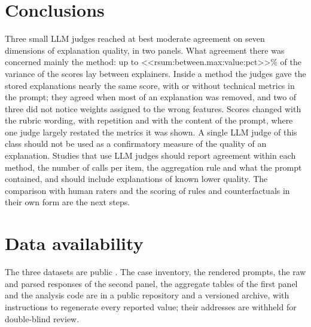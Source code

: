 \documentclass[12pt,letterpaper]{article}
\newcommand{\papercrelease}{paper-c-tm-2026-10-05}
\newcommand{\papercarchive}{\url{https://doi.org/10.5281/zenodo.23165763}}
\newif\iffull
\begin{document}
\section{Conclusions}

Three small LLM judges reached at best moderate agreement on seven dimensions of
explanation quality, in two panels. What agreement there was concerned mainly the method:
up to <<rsum:between.max:value:pct>>\% of the variance of the scores lay between
explainers. Inside a method the judges gave the stored explanations nearly the same
score, with or without technical metrics in the prompt; they agreed when most of an
explanation was removed, and two of three did not notice weights assigned to the wrong
features. Scores changed with the rubric wording, with repetition and with the content
of the prompt, where one judge largely restated the metrics it was shown. A
single LLM judge of this class should not be used as a confirmatory measure of the
quality of an explanation. Studies that use LLM judges should report agreement within
each method, the number of calls per item, the aggregation rule and what the prompt
contained, and should include explanations of known lower quality. The comparison with
human raters and the scoring of rules and counterfactuals in their own form are the next
steps.

\section*{Data availability}
\iffull
The three datasets are public
\cite{becker1996adult,hofmann1994statlog,wolberg1993breast}. The case inventory, the
rendered prompts, the raw and parsed responses of the second panel, the aggregate tables
of the first panel and the analysis code are available at
\url{https://github.com/jonnabio/xai-eval-framework} (release
\texttt{\papercrelease}), archived at \papercarchive. Every reported value can be
regenerated by following \texttt{docs/reports/paper\_c/README.md}.
\else
The three datasets are public
\cite{becker1996adult,hofmann1994statlog,wolberg1993breast}. The case inventory, the
rendered prompts, the raw and parsed responses of the second panel, the aggregate tables
of the first panel and the analysis code are in a public repository and a versioned
archive, with instructions to regenerate every reported value; their addresses are
withheld for double-blind review.
\fi




\end{document}
